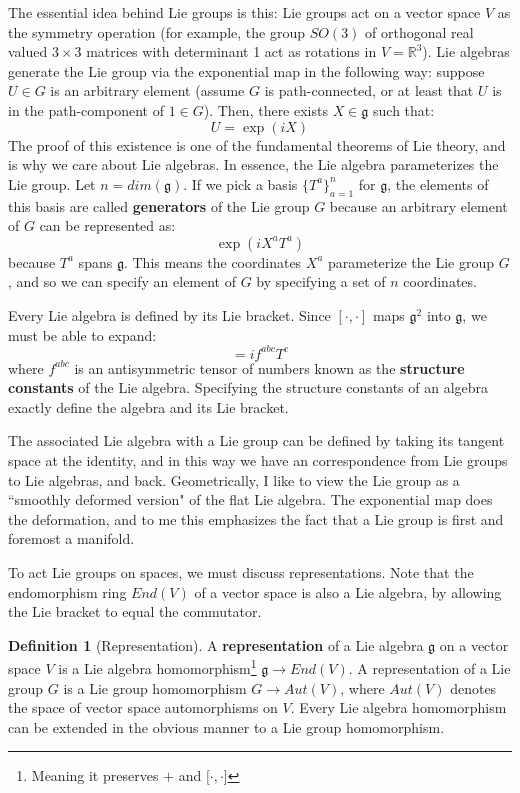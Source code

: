 \documentclass[11pt, oneside]{article}   	%
\theoremstyle{definition}
\newtheorem{definition}{Definition}[section]
\begin{document}
The essential idea behind Lie groups is this: Lie groups act on a vector space $V$ as the symmetry 
operation (for example, the group $SO(3)$ of orthogonal real valued $3\times 3$ matrices with 
determinant 1 act as rotations in $V = \mathbb R^3$). Lie algebras generate the Lie group via the 
exponential map in the following way: suppose $U\in G$ 
is an arbitrary element (assume $G$ is path-connected, or at least that $U$ is in the path-component 
of $1\in G$). Then, there exists $X\in\mathfrak g$ such that:
\begin{equation}
	U = \exp(iX)
\end{equation}
The proof of this existence is one of the fundamental theorems of Lie theory, and is why we care 
about Lie algebras. In essence, the Lie algebra parameterizes the Lie group. Let $n = dim(\mathfrak 
g)$. If we pick a basis 
$\{T^a\}_{a = 1}^n$ for $\mathfrak g$, the elements of this basis are called \textbf{generators} of the 
Lie group $G$ because an arbitrary element of $G$ can be represented as:
\begin{equation}
	\exp(i X^a T^a)
\end{equation}
because $T^a$ spans $\mathfrak g$. This means the coordinates $X^a$ parameterize the Lie 
group $G$, and so we can specify an element of $G$ by specifying a set of $n$ coordinates. 

Every Lie algebra is defined by its Lie bracket. Since $[\cdot, \cdot]$ maps $\mathfrak g^2$ into 
$\mathfrak g$, we must be able to expand:
\begin{equation}
	[T^a, T^b] = if^{abc}T^c
\end{equation}
where $f^{abc}$ is an antisymmetric tensor of numbers known as the \textbf{structure constants} 
of the Lie algebra. Specifying the structure constants of an algebra exactly define the algebra and 
its Lie bracket. 

The associated Lie algebra with a Lie group can be defined by taking its tangent space at the 
identity, and in this way we have an correspondence from Lie groups to Lie algebras, and back. 
Geometrically, I like to view the Lie group as a ``smoothly deformed version" of the flat Lie algebra. 
The exponential map does the deformation, and to me this emphasizes the fact that a Lie group is 
first and foremost a manifold. 

To act Lie groups on spaces, we must discuss representations. Note that the endomorphism ring 
$End(V)$ of a vector space is also a Lie algebra, by allowing the Lie bracket to equal the 
commutator.
\begin{definition}[Representation]
	A \textbf{representation} of a Lie algebra $\mathfrak g$ on a vector space $V$ is a Lie 
	algebra homomorphism\footnote{Meaning it preserves $+$ and $[\cdot, \cdot$]}  
	$\mathfrak g\rightarrow End(V)$. A representation of a Lie group $G$ is a Lie group 
	homomorphism $G\rightarrow Aut(V)$, where $Aut(V)$ denotes the space of vector space 
	automorphisms on $V$. Every Lie algebra homomorphism can be extended in the 
	obvious manner to a Lie group homomorphism.
\end{definition}
\end{document}

